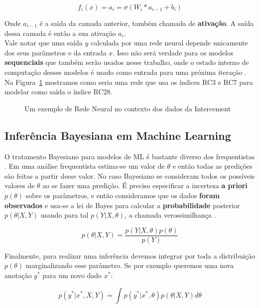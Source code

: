 \[ f_i (x)=  a_i = \sigma(W_i*a_{i-1} + b_i) \]

Onde $a_{i-1}$ é a saída da camada anterior, também chamada de
\textbf{ativação}. A saída dessa camada é então a sua ativação $a_i$. \\ 

Vale notar que uma saída $y$ calculada por uma rede neural depende unicamente dos
seus parâmetros e da entrada $x$. Isso não será verdade para os modelos
\textbf{sequenciais} que também serão usados nesse trabalho, onde o estado
interno de computação desses modelos é usado como entrada para uma próxima
iteração \citep{dlbook}. \\

Na Figura~\ref{fig:nn} mostramos como seria uma rede que usa os índices RC3 e RC7 para
modelar como saída o índice RC28. \\  

\begin{figure}
  \centering
  
  \caption{Um exemplo de Rede Neural no contexto dos dados da Intercement}
  \label{fig:nn}
\end{figure}


\bigskip


\subsection{Inferência Bayesiana em Machine Learning}
\label{sec:bayesinf}
O tratamento Bayesiano para modelos de ML é bastante diverso dos frequentistas \citep{dlbook}.
Em uma análise frequentista estima-se um valor de $\theta$ e então todas as
predições são feitas a partir desse valor. No caso Bayesiano se consideram todos
os possíveis valores de $\theta$ ao se fazer uma predição. É preciso especificar
a incerteza \textbf{a priori} $p(\theta)$ sobre os parâmetros, e então
consideramos que os dados \textbf{foram observados} e usa-se a lei de Bayes para
calcular a \textbf{probabilidade} posterior $p(\theta | X,Y)$ usando para tal
$p(Y |X, \theta)$, a chamada verossimilhança \citep{bayesml}. 

\[    p(\theta | X,Y) = \frac{p(Y| X,\theta) p(\theta)}{p(Y)}   \]

Finalmente, para realizar uma inferência devemos integrar por toda a distribuição $p(\theta)$ marginalizando esse parâmetro. Se por exemplo queremos uma nova anotação $y^*$ para um novo dado $x^*$:


\begin{equation}
  \label{eq:int}
p(y^* | x^* , X,Y) = \int  p(y^* | x^*,\theta) p(\theta | X,Y)  d\theta 
\end{equation}

